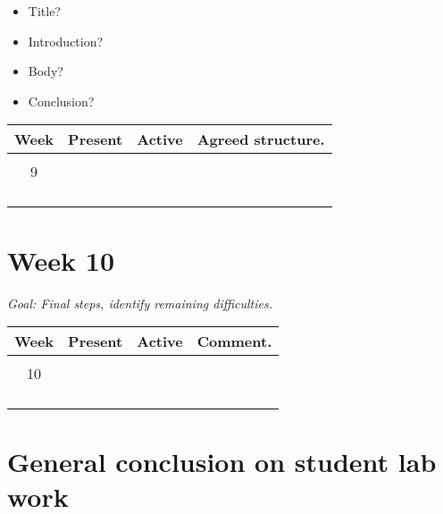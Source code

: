 \documentclass[12pt]{article}
\begin{document}
\begin{itemize}
	\item Title?
	\item Introduction?
	\item Body?
	\item Conclusion?
\end{itemize}

\begin{center}
	\begin{tabular}{c|l|l|p{}}
		\toprule
		Week        & Present & Active & Agreed structure.\\
		\midrule
		            &         &        & \\
		9           &         &        & \\
		            &         &        & \\
		            &         &        & \\
		            &         &        & \\
		            &         &        & \\
	\end{tabular}
\end{center}

\section*{Week 10}
\centering\small{\textit{Goal: Final steps, identify remaining difficulties.}}

\begin{center}
	\begin{tabular}{c|l|l|p{}}
		\toprule
		Week        & Present & Active & Comment.\\
		\midrule
		            &         &        & \\
		10          &         &        & \\
		            &         &        & \\
		            &         &        & \\
		            &         &        & \\
		            &         &        & \\
	\end{tabular}
\end{center}

\section*{General conclusion on student lab work}
\end{document}
